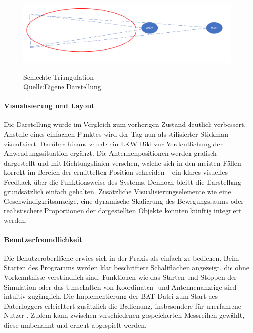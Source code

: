 \documentclass[a4paper, 12pt]{article} %
\begin{document}
\clearpage

\begin{figure}[H]
    \includegraphics[width=1\linewidth]{images/Schlechte Triangulation.png}\\[1ex]
    \centering
    \caption{Schlechte Triangulation \\
            Quelle:Eigene Darstellung}
    \label{ABBILDUNG}
\end{figure}

\paragraph{Visualisierung und Layout}
Die Darstellung wurde im Vergleich zum vorherigen Zustand deutlich verbessert. Anstelle eines einfachen Punktes wird der Tag nun als stilisierter 
Stickman visualisiert. Darüber hinaus wurde ein \ac{LKW}-Bild zur Verdeutlichung der Anwendungssituation ergänzt. Die Antennenpositionen werden 
grafisch dargestellt und mit Richtungslinien versehen, welche sich in den meisten Fällen korrekt im Bereich der ermittelten Position schneiden – ein 
klares visuelles Feedback über die Funktionsweise des Systems. Dennoch bleibt die Darstellung grundsätzlich einfach gehalten. Zusätzliche 
Visualisierungselemente wie eine Geschwindigkeitsanzeige, eine dynamische Skalierung des Bewegungsraums oder realistischere Proportionen der 
dargestellten Objekte könnten künftig integriert werden.

\paragraph{Benutzerfreundlichkeit}
Die Benutzeroberfläche erwies sich in der Praxis als einfach zu bedienen. Beim Starten des Programms werden klar beschriftete Schaltflächen angezeigt, 
die ohne Vorkenntnisse verständlich sind. Funktionen wie das Starten und Stoppen der Simulation oder das Umschalten von Koordinaten- und Antennenanzeige 
sind intuitiv zugänglich. Die Implementierung der \acf{BAT}-Datei zum Start des Datenloggers erleichtert zusätzlich die Bedienung, insbesondere für unerfahrene
Nutzer \cite{nielsen_usability}. Zudem kann zwischen verschiedenen gespeicherten Messreihen gewählt, diese umbenannt und erneut abgespielt werden.
\end{document}

